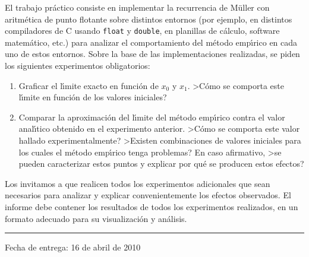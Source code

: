 El trabajo pr\'actico consiste en implementar la recurrencia de M\"uller con aritm\'etica de punto flotante sobre distintos entornos (por ejemplo, en distintos compiladores de C usando \texttt{float} y \texttt{double}, en planillas de c\'alculo, software matem\'atico, etc.) para analizar el comportamiento del m\'etodo emp\'\i rico en cada uno de estos entornos. Sobre la base de las implementaciones realizadas, se piden los siguientes experimentos obligatorios:
\begin{enumerate}
\item Graficar el l\'\i mite exacto en funci\'on de $x_0$ y $x_1$. >C\'omo se comporta este l\'\i mite en funci\'on de los valores iniciales?
\item Comparar la aproximaci\'on del l\'\i mite del m\'etodo emp\'\i rico contra el valor anal\'\i tico obtenido en el experimento anterior. >C\'omo se comporta este valor hallado experimentalmente? >Existen combinaciones de valores iniciales para los cuales el m\'etodo emp\'\i rico tenga problemas? En caso afirmativo, >se pueden caracterizar estos puntos y explicar por qu\'e se producen estos efectos?
\end{enumerate}
Los invitamos a que realicen todos los experimentos adicionales que sean necesarios para analizar y explicar convenientemente los efectos observados. El informe debe contener los resultados de todos los experimentos realizados, en un formato adecuado para su visualizaci\'on y an\'alisis. 

\vskip 15pt
\hrule
\vskip 11pt

Fecha de entrega: 16 de abril de 2010

%
